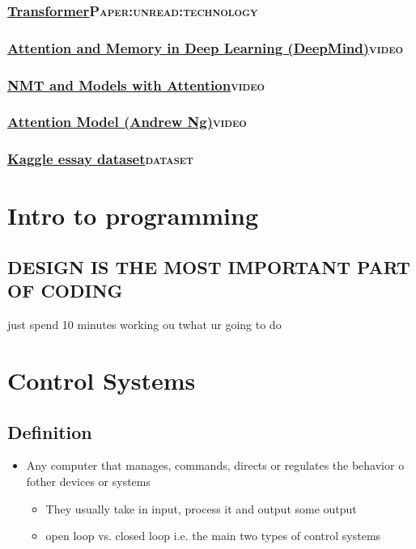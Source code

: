 \documentclass[11pt]{article}
\begin{document}
\subsubsection{\href{./cs/Transformer.pdf}{Transformer}\hfill{}\textsc{Paper:unread:technology}}
\label{sec:org7a118af}
\subsubsection{\href{https://www.youtube.com/watch?v=Q57rzaHHO0k}{Attention and Memory in Deep Learning (DeepMind)}\hfill{}\textsc{video}}
\label{sec:orgd6e0e8d}
\subsubsection{\href{https://www.youtube.com/watch?v=IxQtK2SjWWM}{NMT and Models with Attention}\hfill{}\textsc{video}}
\label{sec:org6a9ccf5}
\subsubsection{\href{https://www.youtube.com/watch?v=quoGRI-1l0A\&t=130s}{Attention Model (Andrew Ng)}\hfill{}\textsc{video}}
\label{sec:org61ae317}
\subsubsection{\href{https://raw.githubusercontent.com/shubhpawar/Automated-Essay-Scoring/master/essays\_and\_scores.csv}{Kaggle essay dataset}\hfill{}\textsc{dataset}}
\label{sec:org5117b9e}
\section{Intro to programming}
\label{sec:orgc7f9e81}
\subsection{DESIGN IS THE MOST IMPORTANT PART OF CODING}
\label{sec:org582d333}
just spend 10 minutes working ou twhat ur going to do
\section{Control Systems}
\label{sec:org15acbae}
\subsection{Definition}
\label{sec:orgac8daf6}
\begin{itemize}
\item Any computer that manages, commands, directs or regulates the behavior o fother devices or systems
\begin{itemize}
\item They usually take in input, process it and output some output
\item open loop vs. closed loop i.e. the main two types of control systems
\end{itemize}
\end{itemize}
\end{document}

